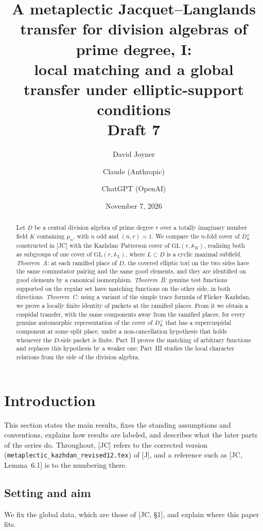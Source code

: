 \documentclass[12pt]{article}
\title{A metaplectic Jacquet--Langlands transfer for division algebras of prime degree, I:\\ local matching and a global transfer under elliptic-support conditions\\[0.4em]\normalsize Draft 7}
\author{David Joyner \and Claude (Anthropic) \and ChatGPT (OpenAI)}
\date{November 7, 2026}
\newcommand{\A}{\mathbb{A}}
\newcommand{\GL}{\mathrm{GL}}
\theoremstyle{plain}
\theoremstyle{definition}
\begin{document}
\maketitle

\begin{abstract}
Let $D$ be a central division algebra of prime degree $r$ over a totally imaginary number field $K$ containing $\mu_n$, with $n$ odd and $(n,r)=1$. We compare the $n$-fold cover of $D^\times_{\A}$ constructed in [JC] with the Kazhdan--Patterson cover of $\GL(r,\A_K)$, realizing both as subgroups of one cover of $\GL(r,\A_L)$, where $L\subset D$ is a cyclic maximal subfield. \emph{Theorem~A:} at each ramified place of $D$, the covered elliptic tori on the two sides have the same commutator pairing and the same good elements, and they are identified on good elements by a canonical isomorphism. \emph{Theorem~B:} genuine test functions supported on the regular set have matching functions on the other side, in both directions. \emph{Theorem~C:} using a variant of the simple trace formula of Flicker--Kazhdan, we prove a locally finite identity of packets at the ramified places. From it we obtain a cuspidal transfer, with the same components away from the ramified places, for every genuine automorphic representation of the cover of $D^\times_{\A}$ that has a supercuspidal component at some split place, under a non-cancellation hypothesis that holds whenever the $D$-side packet is finite. Part~II proves the matching of arbitrary functions and replaces this hypothesis by a weaker one; Part~III studies the local character relations from the side of the division algebra.
\end{abstract}

\tableofcontents

\section{Introduction}\label{sec:intro}
This section states the main results, fixes the standing assumptions and conventions, explains how results are labeled, and describes what the later parts of the series do. Throughout, [JC] refers to the corrected version (\texttt{metaplectic\_kazhdan\_revised12.tex}) of [J], and a reference such as [JC, Lemma~6.1] is to the numbering there.

\subsection{Setting and aim}
We fix the global data, which are those of [JC, \S1], and explain where this paper fits.
\end{document}
